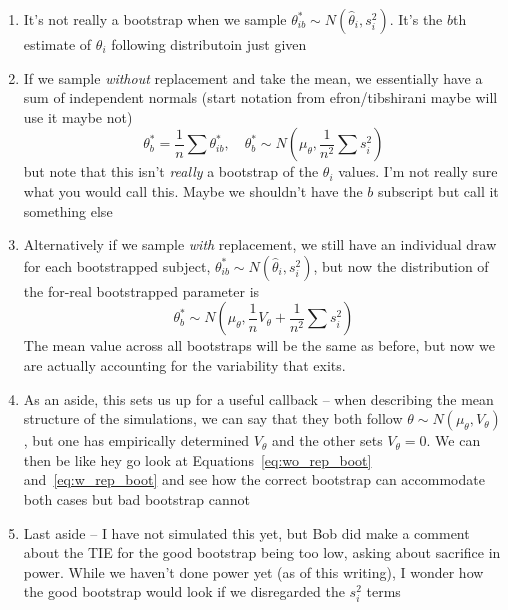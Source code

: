 \documentclass{article}
\begin{document}
\begin{singlespace}
\begin{enumerate}
\vspace{-2mm}
\item It's not really a bootstrap when we sample $\theta^*_{ib} \sim N(\hat{\theta}_i, s_i^2)$. It's the $b$th estimate of $\theta_i$ following distributoin just given
\item If we sample \textit{without} replacement and take the mean, we essentially have a sum of independent normals (start notation from efron/tibshirani maybe will use it maybe not)
\begin{equation}\label{eq:wo_rep_boot}
\theta^{*}_b = \frac1n \sum \theta^{*}_{ib}, \quad \theta^{*}_b  \sim N \left( \mu_{\theta}, \frac{1}{n^2} \sum s_i^2 \right)
\end{equation}
but note that this isn't \textit{really} a bootstrap of the $\theta_i$ values. I'm not really sure what you would call this. Maybe we shouldn't have the $b$ subscript but call it something else
\item Alternatively if we sample \textit{with} replacement, we still have an individual draw for each bootstrapped subject, $\theta^*_{ib} \sim N(\hat{\theta}_i, s_i^2)$, but now the distribution of the for-real bootstrapped parameter is 
\begin{equation}\label{eq:w_rep_boot}
\theta^{*}_b \sim N \left( \mu_{\theta}, \frac1n V_{\theta} + \frac{1}{n^2} \sum s_i^2 \right)
\end{equation}
The mean value across all bootstraps will be the same as before, but now we are actually accounting for the variability that exits.
\item As an aside, this sets us up for a useful callback -- when describing the mean structure of the simulations, we can say that they both follow $\theta \sim N(\mu_{\theta}, V_{\theta})$, but one has empirically determined $V_{\theta}$ and the other sets $V_{\theta} = 0$. We can then be like hey go look at Equations~\ref{eq:wo_rep_boot} and~\ref{eq:w_rep_boot} and see how the correct bootstrap can accommodate both cases but bad bootstrap cannot
\item Last aside -- I have not simulated this yet, but Bob did make a comment about the TIE for the good bootstrap being too low, asking about sacrifice in power. While we haven't done power yet (as of this writing), I wonder how the good bootstrap would look if we disregarded the $s_i^2$ terms
\end{enumerate}
\end{singlespace}
\end{document}
